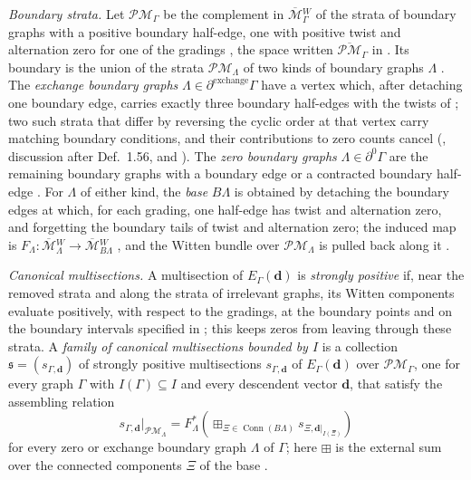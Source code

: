 \emph{Boundary strata.}  Let $\mathcal{PM}_\Gamma$ be the complement in
$\overline{\mathcal M}{}^W_\Gamma$ of the strata of boundary graphs with a
positive boundary half-edge, one with positive twist and alternation zero
for one of the gradings \cite[Def.~1.53]{grossetal2022open}, the space
written
$\overline{\mathcal{PM}}_\Gamma$ in \cite[Notation~3.1]{grossetal2022open}.  Its
boundary is the union of the strata $\mathcal{PM}_\Lambda$ of two kinds of
boundary graphs $\Lambda$ \cite[Def.~3.2]{grossetal2022open}.  The
\emph{exchange boundary graphs} $\Lambda\in\partial^{\mathrm{exchange}}\Gamma$
have a vertex which, after detaching one boundary edge, carries exactly three
boundary half-edges with the twists of \cite[Def.~1.54]{grossetal2022open};
two such strata that differ by reversing the cyclic order at that vertex carry
matching boundary conditions, and their contributions to zero counts cancel
(\cite{grossetal2022open}, discussion after Def.~1.56, and
\cite[Lem.~5.3]{grossetal2022open}).  The \emph{zero
boundary graphs} $\Lambda\in\partial^0\Gamma$ are the remaining boundary
graphs with a boundary edge or a contracted boundary half-edge
\cite[Def.~1.56]{grossetal2022open}.  For $\Lambda$ of either kind, the
\emph{base} $B\Lambda$ is obtained by detaching the boundary edges at which,
for each grading, one half-edge has twist and alternation zero, and
forgetting the boundary tails of twist and alternation zero; the induced map
is $F_\Lambda:\overline{\mathcal M}{}^W_\Lambda\to\overline{\mathcal
M}{}^W_{B\Lambda}$ \cite[Def.~3.5 and Notation~3.6]{grossetal2022open}, and
the Witten bundle over $\mathcal{PM}_\Lambda$ is pulled back along it
\cite[Obs.~3.11]{grossetal2022open}.

\emph{Canonical multisections.}  A multisection of $E_\Gamma(\mathbf d)$ is
\emph{strongly positive} if, near the removed strata and along the strata of
irrelevant graphs, its Witten components evaluate positively, with respect
to the gradings, at the boundary points and on the boundary intervals
specified in \cite[Defs.~3.17 and~3.18]{grossetal2022open}; this keeps zeros
from leaving through these strata.  A \emph{family of canonical multisections bounded by
$I$} is a collection $\mathfrak s=(s_{\Gamma,\mathbf d})$ of strongly positive
multisections $s_{\Gamma,\mathbf d}$ of $E_\Gamma(\mathbf d)$ over
$\mathcal{PM}_\Gamma$, one for every graph $\Gamma$ with
$I(\Gamma)\subseteq I$ and every descendent vector $\mathbf d$, that satisfy
the assembling relation
\begin{equation}\label{eq:GKT-assembling}
 s_{\Gamma,\mathbf d}|_{\mathcal{PM}_\Lambda}
 =F_\Lambda^*
 \left(\boxplus_{\Xi\in\operatorname{Conn}(B\Lambda)}
 s_{\Xi,\mathbf d|_{I(\Xi)}}\right)
\end{equation}
for every zero or exchange boundary graph $\Lambda$ of $\Gamma$; here
$\boxplus$ is the external sum over the connected components $\Xi$ of the
base \cite[Defs.~3.20, 3.27 and~3.28]{grossetal2022open}.

